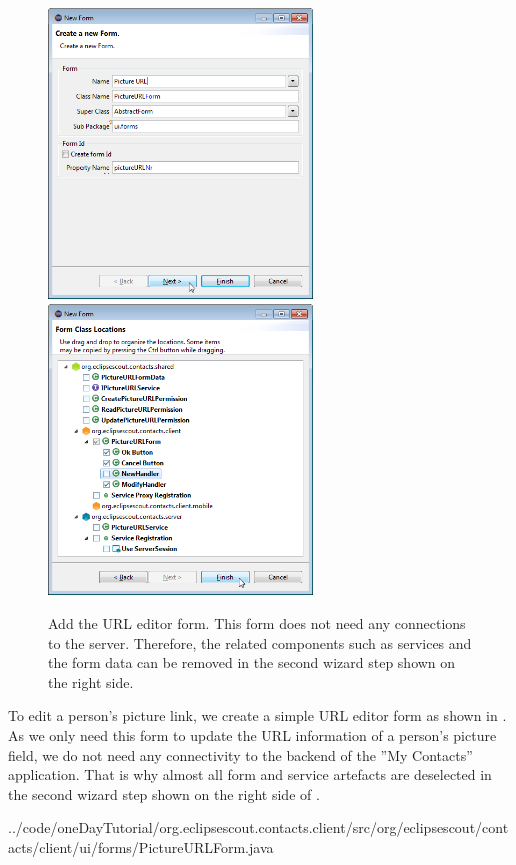 \documentclass[a4paper,10pt,twoside]{book}
\begin{document}
\begin{figure}
\includegraphics[width=7cm]{new_form_url_1.png} \hspace{5mm}
\includegraphics[width=7cm]{new_form_url_2.png}
\caption{Add the URL editor form. This form does not need any connections to the server. Therefore, the related components such as services and the form data can be removed in the second wizard step shown on the right side.}
\end{figure}

To edit a person's picture link, we create a simple URL editor form as shown in . 
As we only need this form to update the URL information of a person's picture field, we do not need any connectivity to the backend of the ''My Contacts'' application. 
That is why almost all form and service artefacts are deselected in the second wizard step shown on the right side of . 


{../code/oneDayTutorial/org.eclipsescout.contacts.client/src/org/eclipsescout/contacts/client/ui/forms/PictureURLForm.java}
\end{document}
